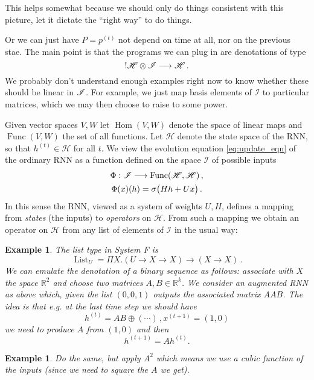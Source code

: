 \documentclass[english,letter paper,12pt,leqno]{article}
\theoremstyle{example}
\newtheorem{example}[theorem]{Example}
\numberwithin{equation}{section}
\def\Hom{\operatorname{Hom}}
\def\Func{\operatorname{Func}}
\begin{document}
This helps somewhat because we should only do things consistent with this picture, let it dictate the ``right way'' to do things.

Or we can just have $P = p^{(t)}$ not depend on time at all, nor on the previous stae. The main point is that the programs we can plug in are denotations of type
\[
{!} \mathscr{H} \otimes \mathscr{I} \longrightarrow \mathscr{H}\,.
\]
We probably don't understand enough examples right now to know whether these should be linear in $\mathscr{I}$. For example, we just map basis elements of $\mathscr{I}$ to particular matrices, which we may then choose to raise to some power.

Given vector spaces $V, W$ let $\Hom(V,W)$ denote the space of linear maps and $\Func(V,W)$ the set of all functions. Let $\mathscr{H}$ denote the state space of the RNN, so that $h^{(t)} \in \mathscr{H}$ for all $t$. We view the evolution equation \eqref{eq:update_eqn} of the ordinary RNN as a function defined on the space $\mathscr{I}$ of possible inputs
\begin{gather*}
\Phi: \mathscr{I} \lto \Func( \mathscr{H}, \mathscr{H} )\,,\\
\Phi( x )( h ) = \sigma\big( H h + U x \big)\,.
\end{gather*}
In this sense the RNN, viewed as a system of weights $U,H$, defines a mapping from \emph{states} (the inputs) to \emph{operators} on $\mathscr{H}$. From such a mapping we obtain an operator on $\mathscr{H}$ from any list of elements of $\mathscr{I}$ in the usual way:

\begin{example} The list type in System F is \cite{??}
\[
\operatorname{List}_U = \Pi X . (U \rightarrow X \rightarrow X) \rightarrow ( X \rightarrow X )\,.
\]
We can emulate the denotation of a binary sequence as follows: associate with $X$ the space $\mathbb{R}^2$ and choose two matrices $A, B \in \mathbb{R}^k$. We consider an augmented RNN as above which, given the list $(0,0,1)$ outputs the associated matrix $AAB$. The idea is that e.g. at the last time step we should have
\[
h^{(t)} = AB \oplus (\cdots)\,, x^{(t+1)} = (1, 0)
\]
we need to produce $A$ from $(1,0)$ and then
\[
h^{(t+1)} = A h^{(t)}.
\]
\end{example}

\begin{example} Do the same, but apply $A^2$ which means we use a cubic function of the inputs (since we need to square the $A$ we get).
\end{example}
\end{document}
